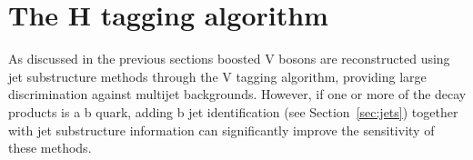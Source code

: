 

\section{The H tagging algorithm}
\label{sec:htagging}

As discussed in the previous sections boosted V bosons are reconstructed using jet substructure methods
through the V tagging algorithm, providing large discrimination against multijet backgrounds.
However, if one or more of the decay products is a b quark, adding b jet identification (see Section~\ref{sec:jets}) together
with jet substructure information can significantly improve the sensitivity of these methods.


